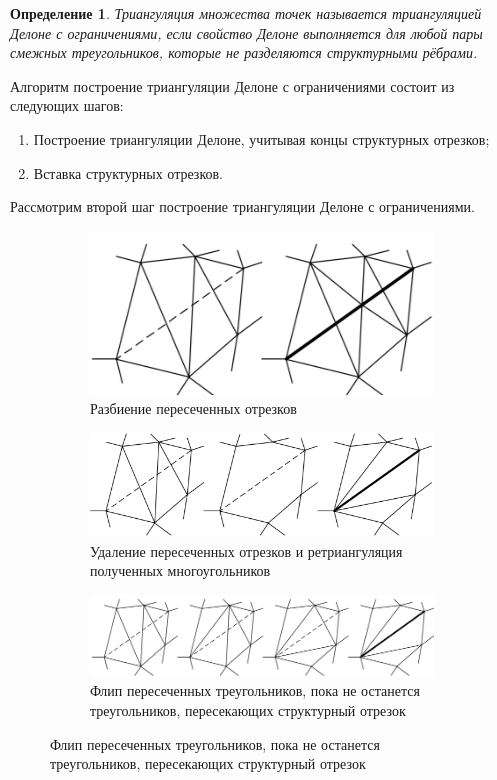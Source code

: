 \documentclass{fefu}
\newtheorem{definition}{Определение}
\begin{document}
\begin{definition}
    Триангуляция множества точек называется триангуляцией Делоне с ограничениями, если свойство Делоне 
    выполняется для любой пары смежных треугольников, которые не разделяются структурными рёбрами.
\end{definition}

Алгоритм построение триангуляции Делоне с ограничениями состоит из следующих шагов:
\begin{enumerate}
    \item Построение триангуляции Делоне, учитывая концы структурных отрезков;
    \item Вставка структурных отрезков.
\end{enumerate}

Рассмотрим второй шаг построение триангуляции Делоне с ограничениями.
\begin{figure}[H]
    \centering
    \begin{subfigure}[t]{\linewidth}
        \centering
        \includegraphics[scale=0.8]{images/BuildDestroying.png}
        \caption{Разбиение пересеченных отрезков}
        \label{BuildDestroying}
    \end{subfigure}
    \begin{subfigure}[t]{\linewidth}
        \centering
        \includegraphics[scale=0.8]{images/DestroyAndBuild}
        \caption{Удаление пересеченных отрезков и ретриангуляция полученных многоугольников}
        \label{DestroyAndBuild}
    \end{subfigure}
    \begin{subfigure}[t]{\linewidth}
        \centering
        \includegraphics[scale=0.8]{images/Rebuilding.png}
        \caption{Флип пересеченных треугольников, пока не останется треугольников, пересекающих структурный отрезок}
        \label{Rebuilding}
    \end{subfigure}
\end{figure}
\end{document}
